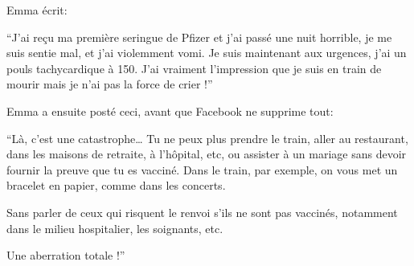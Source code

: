 Emma écrit:

“J'ai reçu ma première seringue de Pfizer et j'ai passé une nuit horrible, je me
suis sentie mal, et j'ai violemment vomi. Je suis maintenant aux urgences, j'ai
un pouls tachycardique à 150. J'ai vraiment l'impression que je suis en train de
mourir mais je n'ai pas la force de crier !”

Emma a ensuite posté ceci, avant que Facebook ne supprime tout:

“Là, c'est une catastrophe… Tu ne peux plus prendre le train, aller au
restaurant, dans les maisons de retraite, à l'hôpital, etc, ou assister à un
mariage sans devoir fournir la preuve que tu es vacciné. Dans le train, par
exemple, on vous met un bracelet en papier, comme dans les concerts.

Sans parler de ceux qui risquent le renvoi s'ils ne sont pas vaccinés, notamment
dans le milieu hospitalier, les soignants, etc.

Une aberration totale !”


